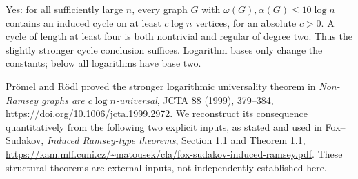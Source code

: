 Yes: for all sufficiently large $n$, every graph $G$ with $\omega(G),\alpha(G)\le10\log n$ contains an induced cycle on at least $c\log n$ vertices, for an absolute $c>0$. A cycle of length at least four is both nontrivial and regular of degree two. Thus the slightly stronger cycle conclusion suffices. Logarithm bases only change the constants; below all logarithms have base two.

Pr\"omel and R\"odl proved the stronger logarithmic universality theorem in \emph{Non-Ramsey graphs are $c\log n$-universal}, JCTA 88 (1999), 379--384, \url{https://doi.org/10.1006/jcta.1999.2972}. We reconstruct its consequence quantitatively from the following two explicit inputs, as stated and used in Fox--Sudakov, \emph{Induced Ramsey-type theorems}, Section 1.1 and Theorem 1.1, \url{https://kam.mff.cuni.cz/~matousek/cla/fox-sudakov-induced-ramsey.pdf}. These structural theorems are external inputs, not independently established here.
